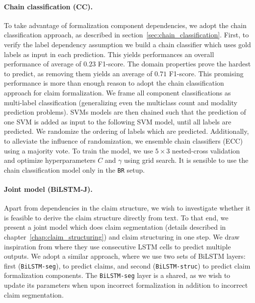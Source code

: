 \paragraph{Chain classification (CC). }
To take advantage of formalization component dependencies, we adopt the chain
classification approach, as described in
section~\ref{sec:chain_classification}.
First, to verify the label dependency assumption we build a chain classifier
which uses gold  labels as input in each prediction.  
This yields performances an overall performance of average of $0.23$ F1-score. 
The domain properties prove the hardest to predict, as removing them yields
an average of $0.71$ F1-score. 
This promising performance is more than enough reason to adopt the
chain classification approach for claim formalization. 
We frame all component classifications as multi-label classification 
(generalizing even the multiclass count and modality prediction problems).
SVMs models are then chained such that the prediction of one SVM is added as
input to the following SVM model, until all labels are predicted. We randomize 
the ordering of labels which are predicted.
Additionally, to alleviate the influence of randomization, we 
ensemble chain classifiers (ECC) using a majority vote. 
To train the model, we use $5 \times 3$ nested-cross validation
and optimize hyperparameters $C$ and $\gamma$ using grid search. 
It is sensible to use the chain classification model only in the
\texttt{BR} setup.

\paragraph{Joint model (BiLSTM-J). } 
Apart from dependencies in the claim structure, we wish to investigate whether
it is feasible to derive the claim structure directly from text. 
To that end, we present a joint model which does claim segmentation (details described in
chapter~\ref{chap:claim_structuring}) and claim structuring in one step. We
draw inspiration from \citep{miwa2016end} where they use consecutive
LSTM cells to predict multiple outputs. We adopt a similar approach, where we
use two sets of BiLSTM layers: first (\texttt{BiLSTM-seg}), to predict claims, and
second (\texttt{BiLSTM-struc}) to predict claim formalization components. The
\texttt{BiLSTM-seg} layer is a shared, as we wish to update its parameters
when upon incorrect formalization in addition to incorrect claim segmentation.

